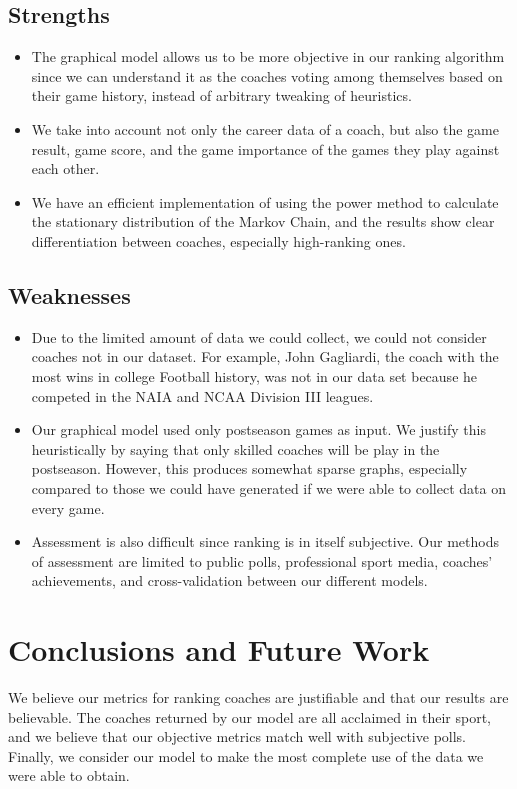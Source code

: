 \documentclass[11pt,notitlepage]{article}
\begin{document}
\subsection{Strengths}
\begin{itemize}
\item The graphical model allows us to be more objective in our ranking algorithm since we can understand it as the coaches voting among themselves based on their game history, instead of arbitrary tweaking of heuristics.

\item We take into account not only the career data of a coach, but also the game result, game score, and the game importance of the games they play against each other.

\item We have an efficient implementation of using the power method to calculate the stationary distribution of the Markov Chain, and the results show clear differentiation between coaches, especially high-ranking ones.
\end{itemize}

\subsection{Weaknesses}
\begin{itemize}
\item Due to the limited amount of data we could collect, we could not consider coaches not in our dataset. For example, John Gagliardi, the coach with the most wins in college Football history, was not in our data set because he competed in the NAIA and NCAA Division III leagues. 

\item Our graphical model used only postseason games as input. We justify this heuristically by saying that only skilled coaches will be play in the postseason. However, this produces somewhat sparse graphs, especially compared to those we could have generated if we were able to collect data on every game.

\item Assessment is also difficult since ranking is in itself subjective. Our methods of assessment are limited to public polls, professional sport media, coaches' achievements, and cross-validation between our different models.

\end{itemize}

\section{Conclusions and Future Work}
We believe our metrics for ranking coaches are justifiable and that our results are believable. The coaches returned by our model are all acclaimed in their sport, and we believe that our objective metrics match well with subjective polls. Finally, we consider our model to make the most complete use of the data we were able to obtain.
\end{document}
